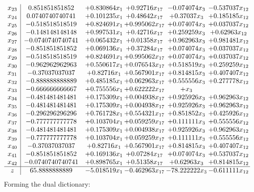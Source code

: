 \documentclass[11pt]{article}
\begin{document}
\[\begin{array}{c| c c@{\hskip 2pt} c@{\hskip 2pt} c@{\hskip 2pt} c@{\hskip 2pt} }
 x_{23}   &  0.851851851852 & + 0.830864 x_{1} & + 0.92716 x_{17} & -0.074074 x_{3} & -0.537037 x_{12}\\
 x_{24}   &  0.0740740740741 & + 0.101235 x_{1} & + 0.48642 x_{17} & + 0.37037 x_{3} & + 0.185185 x_{12}\\
 x_{25}   &  -0.518518518519 & + 0.824691 x_{1} & + 0.995062 x_{17} & + 0.074074 x_{3} & + 0.037037 x_{12}\\
 x_{26}   &  -0.148148148148 & + 0.997531 x_{1} & + 0.42716 x_{17} & + 0.259259 x_{3} & + 0.62963 x_{12}\\
 x_{27}   &  -0.0740740740741 & + 0.065432 x_{1} & + 0.01358 x_{17} & + 0.962963 x_{3} & + 0.981481 x_{12}\\
 x_{28}   &  -0.851851851852 & + 0.069136 x_{1} & + 0.37284 x_{17} & + 0.074074 x_{3} & + 0.037037 x_{12}\\
 x_{29}   &  -0.518518518519 & + 0.824691 x_{1} & + 0.995062 x_{17} & + 0.074074 x_{3} & + 0.037037 x_{12}\\
 x_{30}   &  -0.962962962963 & + 0.550617 x_{1} & + 0.076543 x_{17} & + 0.518519 x_{3} & + 0.259259 x_{12}\\
 x_{31}   &  -0.37037037037 & + 0.82716 x_{1} & + 0.567901 x_{17} & + 0.814815 x_{3} & + 0.407407 x_{12}\\
 x_{32}   &  -0.888888888889 & + 0.485185 x_{1} & + 0.062963 x_{17} & + 0.555556 x_{3} & + 0.277778 x_{12}\\
 x_{33}   &  -0.666666666667 & + 0.755556 x_{1} & + 0.622222 x_{17} & +  x_{3} &   \\
 x_{34}   &  -0.481481481481 & + 0.175309 x_{1} & + 0.004938 x_{17} & + 0.925926 x_{3} & + 0.962963 x_{12}\\
 x_{35}   &  -0.481481481481 & + 0.175309 x_{1} & + 0.004938 x_{17} & + 0.925926 x_{3} & + 0.962963 x_{12}\\
 x_{36}   &  -0.296296296296 & + 0.761728 x_{1} & + 0.554321 x_{17} & + 0.851852 x_{3} & + 0.425926 x_{12}\\
 x_{37}   &  -0.777777777778 & + 0.103704 x_{1} & + 0.059259 x_{17} & + 0.111111 x_{3} & + 0.555556 x_{12}\\
 x_{38}   &  -0.481481481481 & + 0.175309 x_{1} & + 0.004938 x_{17} & + 0.925926 x_{3} & + 0.962963 x_{12}\\
 x_{39}   &  -0.777777777778 & + 0.103704 x_{1} & + 0.059259 x_{17} & + 0.111111 x_{3} & + 0.555556 x_{12}\\
 x_{40}   &  -0.37037037037 & + 0.82716 x_{1} & + 0.567901 x_{17} & + 0.814815 x_{3} & + 0.407407 x_{12}\\
 x_{41}   &  -0.851851851852 & + 0.169136 x_{1} & + 0.07284 x_{17} & + 0.074074 x_{3} & + 0.537037 x_{12}\\
 x_{42}   &  -0.0740740740741 & + 0.898765 x_{1} & + 0.51358 x_{17} & + 0.62963 x_{3} & + 0.814815 x_{12}\\
\hline
z    &  65.8888888889 & -5.018519 x_{1} & -0.462963 x_{17} & -78.222222 x_{3} & -0.611111 x_{12}\\
\end{array}\]
Forming the dual dictionary:
\end{document}
